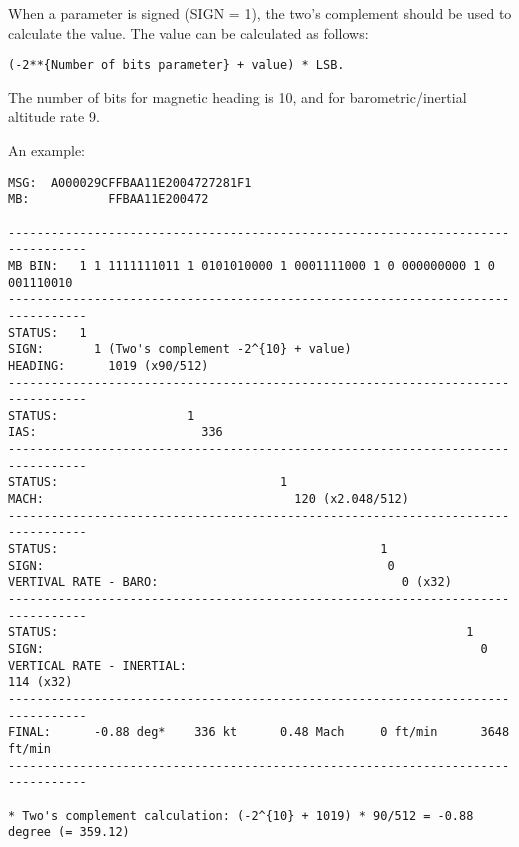 When a parameter is signed (SIGN = 1), the two's complement should be used to calculate the value.
The value can be calculated as follows:

\begin{verbatim}
(-2**{Number of bits parameter} + value) * LSB.
\end{verbatim}
The number of bits for magnetic heading is 10, and for barometric/inertial altitude rate 9.


An example:

\begin{verbatim}
MSG:  A000029CFFBAA11E2004727281F1
MB:           FFBAA11E200472

---------------------------------------------------------------------------------
MB BIN:   1 1 1111111011 1 0101010000 1 0001111000 1 0 000000000 1 0 001110010
---------------------------------------------------------------------------------
STATUS:   1
SIGN:       1 (Two's complement -2^{10} + value)
HEADING:      1019 (x90/512)
---------------------------------------------------------------------------------
STATUS:                  1
IAS:                       336
---------------------------------------------------------------------------------
STATUS:                               1
MACH:                                   120 (x2.048/512)
---------------------------------------------------------------------------------
STATUS:                                             1
SIGN:                                                0
VERTIVAL RATE - BARO:                                  0 (x32)
---------------------------------------------------------------------------------
STATUS:                                                         1
SIGN:                                                             0
VERTICAL RATE - INERTIAL:                                           114 (x32)
---------------------------------------------------------------------------------
FINAL:      -0.88 deg*    336 kt      0.48 Mach     0 ft/min      3648 ft/min
---------------------------------------------------------------------------------

* Two's complement calculation: (-2^{10} + 1019) * 90/512 = -0.88 degree (= 359.12)
\end{verbatim}
